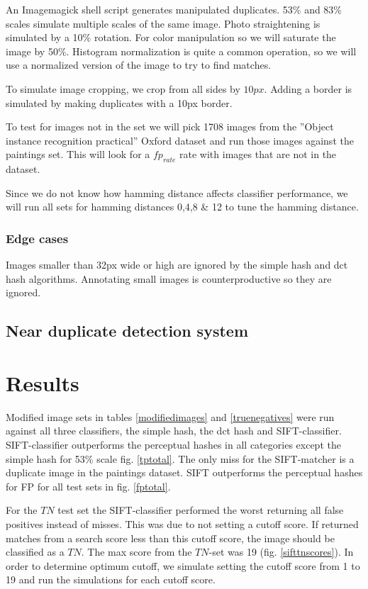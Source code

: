 \documentclass[english,12pt,a4paper,pdftex,elec,utf8]{aaltothesis}
\begin{document}
An Imagemagick shell script generates manipulated duplicates. 53\% and 83\% scales simulate multiple scales of the same image. Photo straightening is simulated by a 10\% rotation. For color manipulation so we will saturate the image by 50\%. Histogram normalization is quite a common operation, so we will use a normalized version of the image to try to find matches.

To simulate image cropping, we crop from all sides by $10px$. Adding a border is simulated by making duplicates with a 10px border.

To test for images not in the set we will pick 1708 images from the ''Object instance recognition practical'' Oxford dataset and run those images against the paintings set. This will look for a $fp_{rate}$ rate with images that are not in the dataset.

Since we do not know how hamming distance affects classifier performance, we will run all sets for hamming distances 0,4,8 \& 12 to tune the hamming distance.


\subsubsection{Edge cases}
Images smaller than 32px wide or high are ignored by the simple hash and dct hash algorithms. Annotating small images is counterproductive so they are ignored.


\subsection{Near duplicate detection system}

\clearpage

\section{Results}
Modified image sets in tables \ref{modifiedimages} and \ref{truenegatives} were run against all three classifiers, the simple hash, the dct hash and SIFT-classifier. SIFT-classifier outperforms the perceptual hashes in all categories except the simple hash for 53\% scale fig. \ref{tptotal}. The only miss for the SIFT-matcher is a duplicate image in the paintings dataset. SIFT outperforms the perceptual hashes for FP for all test sets in fig. \ref{fptotal}.

For the $TN$ test set the SIFT-classifier performed the worst returning all false positives instead of misses. This was due to not setting a cutoff score. If returned matches from a search score less than this cutoff score, the image should be classified as a $TN$. The max score from the $TN$-set was 19 (fig. \ref{sifttnscores}). In order to determine optimum cutoff, we simulate setting the cutoff score from 1 to 19 and run the simulations for each cutoff score.
\end{document}
